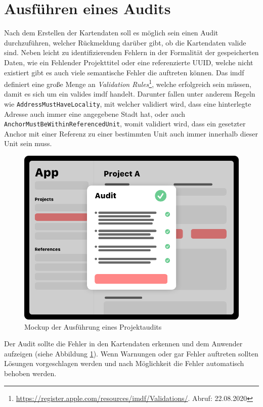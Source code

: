 \section{Ausführen eines Audits}
\label{sec:validation}
Nach dem Erstellen der Kartendaten soll es möglich sein einen Audit durchzuführen, welcher Rückmeldung darüber gibt, ob die Kartendaten valide sind.
Neben leicht zu identifizierenden Fehlern in der Formalität der gespeicherten Daten, wie ein Fehlender Projekttitel oder eine referenzierte UUID, welche nicht existiert gibt es auch viele semantische Fehler die auftreten können.
Das \acl{imdf} definiert eine große Menge an \emph{Validation Rules}\footnote{\url{https://register.apple.com/resources/imdf/Validations/}. Abruf: 22.08.2020}, welche erfolgreich sein müssen, damit es sich um ein valides \ac{imdf} handelt.
Darunter fallen unter anderem Regeln wie \texttt{AddressMustHaveLocality}, mit welcher validiert wird, dass eine hinterlegte Adresse auch immer eine angegebene Stadt hat, oder auch \texttt{AnchorMustBeWithinReferencedUnit}, womit validiert wird, dass ein gesetzter Anchor mit einer Referenz zu einer bestimmten Unit auch immer innerhalb dieser Unit sein muss.
\begin{figure}[h!]
	\centering
	\vspace{15pt}
	\includegraphics[scale=0.4]{images/design-project-audit}
	\caption{Mockup der Ausführung eines Projektaudits}
	\label{fig:design-project-audit}
\end{figure}
Der Audit sollte die Fehler in den Kartendaten erkennen und dem Anwender aufzeigen (siehe Abbildung \ref{fig:design-project-audit}).
Wenn Warnungen oder gar Fehler auftreten sollten Lösungen vorgeschlagen werden und nach Möglichkeit die Fehler automatisch behoben werden.

